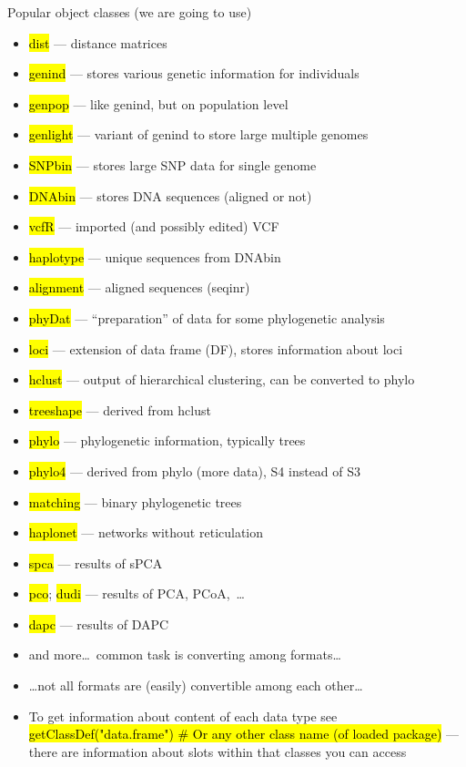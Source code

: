 \documentclass[compress, ucs, xelatex, 11pt, xcolor=svgnames,
	hyperref={
		bookmarks=true,
		unicode=true,
		colorlinks=true,
		pdftitle={Molecular data in R},
		plainpages=false,
		pdfauthor={Vojtech Zeisek},
		pdfsubject={Course about phylogeny and evolution in R},
		pdfcreator={XeLaTeX},
		pdfkeywords={R, evolution, phylogeny, molecular data},
		linkcolor=Tomato,
		anchorcolor=SaddleBrown,
		citecolor=Goldenrod,
		filecolor=DarkMagenta,
		menucolor=Sienna,
		urlcolor=DarkTurquoise,
		pdftex},
	url={hyphens, lowtilde} %
	]{beamer}
\renewcommand{\texttt}[1]{\hl{\ttfamily #1}}
\begin{document}
\begin{frame}[allowframebreaks]{Popular object classes (we are going to use)}
	\begin{itemize}
		\item \texttt{dist} --- distance matrices
		\item \texttt{genind} --- stores various genetic information for individuals
		\item \texttt{genpop} --- like genind, but on population level
		\item \texttt{genlight} --- variant of genind to store large multiple genomes
		\item \texttt{SNPbin} --- stores large SNP data for single genome
		\item \texttt{DNAbin} --- stores DNA sequences (aligned or not)
		\item \texttt{vcfR} --- imported (and possibly edited) VCF
		\item \texttt{haplotype} --- unique sequences from DNAbin
		\item \texttt{alignment} --- aligned sequences (seqinr)
		\item \texttt{phyDat} --- ``preparation'' of data for some phylogenetic analysis
		\item \texttt{loci} --- extension of data frame (DF), stores information about loci
		\item \texttt{hclust} --- output of hierarchical clustering, can be converted to phylo
		\item \texttt{treeshape} --- derived from hclust
		\item \texttt{phylo} --- phylogenetic information, typically trees
		\item \texttt{phylo4} --- derived from phylo (more data), S4 instead of S3
		\item \texttt{matching} --- binary phylogenetic trees
		\item \texttt{haplonet} --- networks without reticulation
		\item \texttt{spca} --- results of sPCA
		\item \texttt{pco}; \texttt{dudi} --- results of PCA, PCoA,~\ldots
		\item \texttt{dapc} --- results of DAPC
		\item and more\ldots~common task is converting among formats\ldots
		\item \ldots not all formats are (easily) convertible among each other\ldots
		\item To get information about content of each data type see \texttt{getClassDef("data.frame") \# Or any other class name (of loaded package)} --- there are information about slots within that classes you can access
	\end{itemize}
\end{frame}
\end{document}

